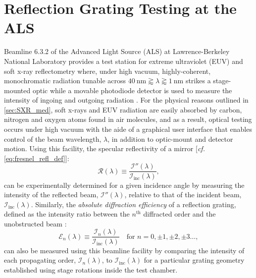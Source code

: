 \section[Reflection Grating Testing at the Advanced Light Source]{Reflection Grating Testing at the ALS}\label{sec:als_testing}
Beamline 6.3.2 of the Advanced Light Source (ALS) \cite{ALS_web,ALS_632} at Lawrence-Berkeley National Laboratory \cite{LBNL_web} provides a test station for extreme ultraviolet (EUV) and soft x-ray reflectometry where, under high vacuum, highly-coherent, monochromatic radiation tunable across $\SI{40}{\nm} \gtrapprox \lambda \gtrapprox \SI{1}{\nm}$ strikes a stage-mounted optic while a movable photodiode detector is used to measure the intensity of ingoing and outgoing radiation \cite{Underwood96,Gullikson01}. 
For the physical reasons outlined in \cref{sec:SXR_med}, soft x-rays and EUV radiation are easily absorbed by carbon, nitrogen and oxygen atoms found in air molecules, and as a result, optical testing occurs under high vacuum with the aide of a graphical user interface that enables control of the beam wavelength, $\lambda$, in addition to optic-mount and detector motion. 
Using this facility, the specular reflectivity of a mirror [\emph{cf.\@} \cref{eq:fresnel_refl_def}]: 
\begin{equation}
 \mathcal{R} \left( \lambda \right) \equiv \frac{\mathcal{I}''\!\left( \lambda \right)}{\mathcal{I}_{\text{inc}} \!\left( \lambda \right)} ,
 \end{equation} 
can be experimentally determined for a given incidence angle by measuring the intensity of the reflected beam, $\mathcal{I}''\left( \lambda \right)$, relative to that of the incident beam, $\mathcal{I}_{\text{inc}} \!\left( \lambda \right)$. 
Similarly, the \emph{absolute diffraction efficiency} of a reflection grating, defined as the intensity ratio between the $n^{\text{th}}$ diffracted order and the unobstructed beam \cite{Loewen97}: %
\begin{equation}\label{eq:diffraction_efficiency}
 \mathscr{E}_n \! \left( \lambda \right)  \equiv \frac{\mathcal{I}_n \! \left( \lambda \right)}{\mathcal{I}_{\text{inc}} \! \left( \lambda \right)} \quad \text{for } n = 0, \pm 1, \pm 2, \pm 3 \dotsc , 
 \end{equation} 
can also be measured using this beamline facility by comparing the intensity of each propagating order, $\mathcal{I}_n \! \left( \lambda \right)$, to $\mathcal{I}_{\text{inc}} \!\left( \lambda \right)$ for a particular grating geometry established using stage rotations inside the test chamber. 

